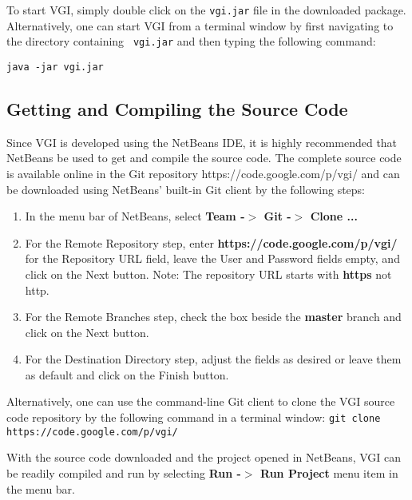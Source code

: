 To start VGI, simply double click on the {\tt vgi.jar} file in the
downloaded package.  Alternatively, one can start VGI from a
terminal window by first navigating to the directory containing {\tt
vgi.jar} and then typing the following command:
\begin{center} {\tt java -jar vgi.jar} \end{center}



% 
\subsection{Getting and Compiling the Source Code}


Since VGI is developed using the NetBeans IDE, it is highly
recommended that NetBeans be used to get and compile the source
code.  The complete source code is available online in the Git
repository https://code.google.com/p/vgi/ and can be downloaded
using NetBeans' built-in Git client by the following steps:
\begin{enumerate}
\item   In the menu bar of NetBeans, select {\bf Team -$>$ Git -$>$ Clone
...}
\item
For the Remote Repository step, enter {\bf
https://code.google.com/p/vgi/} for the Repository URL field, leave
the User and Password fields empty, and click on the Next button.
Note:  The repository URL starts with {\bf https} not http.
\item For the Remote Branches step, check the box beside the {\bf
master} branch and click on the Next button.
\item  For the Destination Directory step, adjust the fields as
desired or leave them as default and click on the Finish button.
\end{enumerate}

Alternatively, one can use the command-line Git client to clone the
VGI source code repository by the following command in a terminal
window: {\tt git clone  https://code.google.com/p/vgi/}

With the source code downloaded and the project opened in NetBeans,
VGI can be readily compiled and run by selecting {\bf Run -$>$ Run
Project} menu item in the menu bar.



% 
